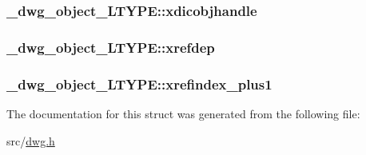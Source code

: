 \hypertarget{struct__dwg__object__LTYPE_a8ca2f61eff5a69ebeac1a225439451da}{
\subsubsection[{xdicobjhandle}]{ {\bf \-\_\-dwg\-\_\-object\-\_\-\-L\-T\-Y\-P\-E\-::xdicobjhandle}}}\label{struct__dwg__object__LTYPE_a8ca2f61eff5a69ebeac1a225439451da}
\hypertarget{struct__dwg__object__LTYPE_aca4cc4d1c08f02bef40fee719aa69411}{
\subsubsection[{xrefdep}]{ {\bf \-\_\-dwg\-\_\-object\-\_\-\-L\-T\-Y\-P\-E\-::xrefdep}}}\label{struct__dwg__object__LTYPE_aca4cc4d1c08f02bef40fee719aa69411}
\hypertarget{struct__dwg__object__LTYPE_afe48721c9af1ced8d9bb146d58aac5c4}{
\subsubsection[{xrefindex\-\_\-plus1}]{ {\bf \-\_\-dwg\-\_\-object\-\_\-\-L\-T\-Y\-P\-E\-::xrefindex\-\_\-plus1}}}\label{struct__dwg__object__LTYPE_afe48721c9af1ced8d9bb146d58aac5c4}


\-The documentation for this struct was generated from the following file\-:\begin{DoxyCompactItemize}
\item 
src/\hyperlink{dwg_8h}{dwg.\-h}\end{DoxyCompactItemize}
